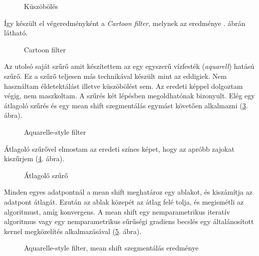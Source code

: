\begin{figure}[h!]
\centering
{}
\caption{Küszöbölés} 
\label{fig:2_cartoon4}
\end{figure}

Így készült el végeredményként a \textit{Cartoon filter}, melynek az eredménye . ábrán látható.

\begin{figure}[h!]
\centering
{}
\caption{Cartoon filter} 
\label{fig:2_cartoon5}
\end{figure}


Az utolsó saját szűrő amit készítettem az egy egyszerű vízfesték (\textit{aquarell}) hatású szűrő. Ez a szűrő teljesen más technikával készült mint az eddigiek. Nem használtam éldetektálást illetve küszöbölést sem. Az eredeti képpel dolgoztam végig, nem maszkoltam. A szűrés két lépésben megoldhatónak bizonyult. Elég egy átlagoló szűrés és egy mean shift szegmentálás egymást követően alkalmazni (\ref{fig:paint}. ábra).

\begin{figure}[h!]
\centering
{}
\caption{Aquarelle-style filter} 
\label{fig:paint}
\end{figure}


Átlagoló szűrővel elmostam az eredeti színes képet, hogy az apróbb zajokat kiszűrjem (\ref{fig:paint1}. ábra).

\begin{figure}[h!]
\centering
{}
\caption{Átlagoló szűrő  } 
\label{fig:paint1}
\end{figure}


Minden egyes adatpontnál a mean shift meghatároz egy ablakot, és kiszámítja az adatpont átlagát. Ezután az ablak közepét az átlag felé tolja, és megismétli az algoritmust, amíg konvergens. A mean shift egy nemparametrikus iteratív algoritmus vagy egy nemparametrikus sűrűségi gradiens becslés egy általánosított kernel megközelítés alkalmazásával (\ref{fig:paint2}. ábra).

\begin{figure}[h!]
\centering
{}
\caption{Aquarelle-style filter, mean shift szegmentálás  eredménye} 
\label{fig:paint2}
\end{figure}

